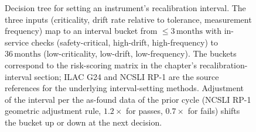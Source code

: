 \begin{figure}[htbp]
\caption[Recalibration interval decision tree]{Decision tree for
setting an instrument's recalibration interval. The three inputs
(criticality, drift rate relative to tolerance, measurement
frequency) map to an interval bucket from $\leq 3 \,\text{months}$
with in-service checks (safety-critical, high-drift,
high-frequency) to $36 \,\text{months}$ (low-criticality, low-drift,
low-frequency). The buckets correspond to the risk-scoring
matrix in the chapter's recalibration-interval section; ILAC G24
\cite{std:ch03t3-ilac-g24-2022} and NCSLI RP-1
\cite{web:ch03t3-ncsli-rp-1-2010} are the source references for the
underlying interval-setting methods. Adjustment of the interval per
the as-found data of the prior cycle (NCSLI RP-1 geometric
adjustment rule, $1.2 \times$ for passes, $0.7 \times$ for fails)
shifts the bucket up or down at the next decision.}
\label{fig:vol01:ch03:interval-tree}
\end{figure}
